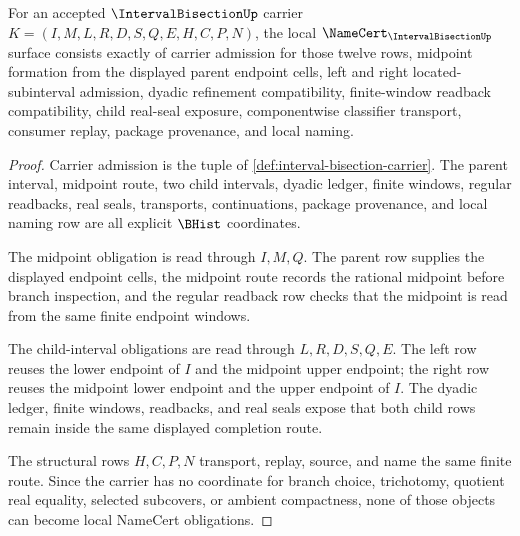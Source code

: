 \begin{theorem}
\label{thm:interval-bisection-namecert-obligations}
For an accepted $\IntervalBisectionUp$ carrier $K=(I,M,L,R,D,S,Q,E,H,C,P,N)$, the local $\NameCert_{\IntervalBisectionUp}$ surface consists exactly of carrier admission for those twelve rows, midpoint formation from the displayed parent endpoint cells, left and right located-subinterval admission, dyadic refinement compatibility, finite-window readback compatibility, child real-seal exposure, componentwise classifier transport, consumer replay, package provenance, and local naming.
\end{theorem}
\begin{proof}
Carrier admission is the tuple of \autoref{def:interval-bisection-carrier}. The parent interval, midpoint route, two child intervals, dyadic ledger, finite windows, regular readbacks, real seals, transports, continuations, package provenance, and local naming row are all explicit $\BHist$ coordinates.

The midpoint obligation is read through $I,M,Q$. The parent row supplies the displayed endpoint cells, the midpoint route records the rational midpoint before branch inspection, and the regular readback row checks that the midpoint is read from the same finite endpoint windows.

The child-interval obligations are read through $L,R,D,S,Q,E$. The left row reuses the lower endpoint of $I$ and the midpoint upper endpoint; the right row reuses the midpoint lower endpoint and the upper endpoint of $I$. The dyadic ledger, finite windows, readbacks, and real seals expose that both child rows remain inside the same displayed completion route.

The structural rows $H,C,P,N$ transport, replay, source, and name the same finite route. Since the carrier has no coordinate for branch choice, trichotomy, quotient real equality, selected subcovers, or ambient compactness, none of those objects can become local NameCert obligations.
\end{proof}

